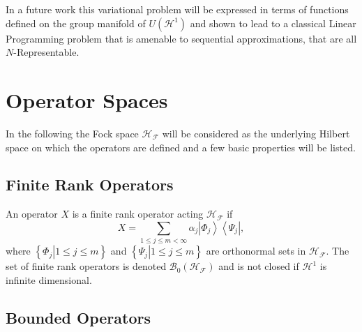 \documentclass[aps,preprint]{revtex4}%
\begin{document}
In a future work this variational problem will be expressed in terms of
functions defined on the group manifold of $U\left(  \mathcal{H}^{1}\right)  $
and shown to lead to a classical Linear Programming problem that is amenable
to sequential approximations, that are all $N$-Representable.

\appendix


\section{Operator Spaces \label{Operators}}

In the following the Fock space $\mathcal{H}_{\mathcal{F}}$ will be considered
as the underlying Hilbert space on which the operators are defined and a few
basic properties will be listed.

\subsection{Finite Rank Operators}

An operator $X$ is a finite rank operator acting $\mathcal{H}_{\mathcal{F}}$
if
\begin{equation}
X=\sum_{1\leq j\leq m<\infty}\alpha_{j}\left\vert \Phi_{j}\right\rangle
\left\langle \Psi_{j}\right\vert ,
\end{equation}
where $\left\{  \left.  \Phi_{j}\right\vert 1\leq j\leq m\right\}  $ and
$\left\{  \left.  \Psi_{j}\right\vert 1\leq j\leq m\right\}  $ are orthonormal
sets in $\mathcal{H}_{\mathcal{F}}.$ The set of finite rank operators is
denoted $\mathcal{B}_{0}\left(  \mathcal{H}_{\mathcal{F}}\right)  $ and is not
closed if $\mathcal{H}^{1}$ is infinite dimensional.

\subsection{Bounded Operators}
\end{document}
